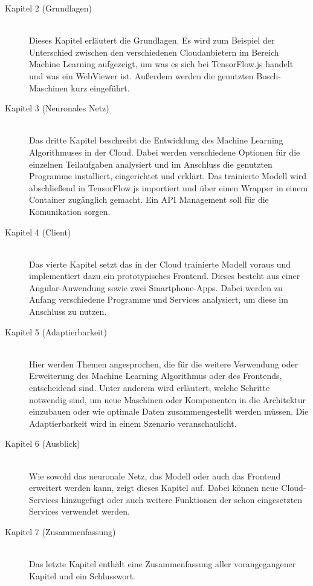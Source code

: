 \begin{description}

    \item[Kapitel 2 (Grundlagen)]\hfill \\
    Dieses Kapitel erläutert die Grundlagen. Es wird zum Beispiel der Unterschied zwischen den verschiedenen
    Cloudanbietern im Bereich Machine Learning aufgezeigt, um was es sich bei TensorFlow.js handelt und was ein WebViewer
    ist. Außerdem werden die genutzten Bosch-Maschinen kurz eingeführt.

    \item[Kapitel 3 (Neuronales Netz)]\hfill \\
    Das dritte Kapitel beschreibt die Entwicklung des Machine Learning Algorithmuses in der Cloud. Dabei werden
    verschiedene Optionen für die einzelnen Teilaufgaben analysiert und im Anschluss die genutzten Programme
    installiert, eingerichtet und erklärt. Das trainierte Modell wird abschließend in TensorFlow.js importiert und über
    einen Wrapper in einem Container zugänglich gemacht. Ein API Management soll für die Komunikation sorgen.

    \item[Kapitel 4 (Client)]\hfill \\
    Das vierte Kapitel setzt das in der Cloud trainierte Modell voraus und implementiert dazu ein prototypisches
    Frontend. Dieses besteht aus einer Angular-Anwendung sowie zwei Smartphone-Apps. Dabei werden zu Anfang verschiedene
    Programme und Services analysiert, um diese im Anschluss zu nutzen.

    \item[Kapitel 5 (Adaptierbarkeit)]\hfill \\
    Hier werden Themen angesprochen, die für die weitere Verwendung oder Erweiterung des Machine Learning Algorithmus
    oder des Frontends, entscheidend sind. Unter anderem wird erläutert, welche Schritte notwendig sind, um neue
    Maschinen oder Komponenten in die Architektur einzubauen oder wie optimale Daten zusammengestellt werden müssen. Die
    Adaptierbarkeit wird in einem Szenario veranschaulicht.

    \item[Kapitel 6 (Ausblick)]\hfill \\
    Wie sowohl das neuronale Netz, das Modell oder auch das Frontend erweitert werden kann, zeigt dieses Kapitel auf.
    Dabei können neue Cloud-Services hinzugefügt oder auch weitere Funktionen der schon eingesetzten Services verwendet
    werden.

    \item[Kapitel 7 (Zusammenfassung)]\hfill \\
    Das letzte Kapitel enthält eine Zusammenfassung aller vorangegangener Kapitel und ein Schlusswort.

\end{description}